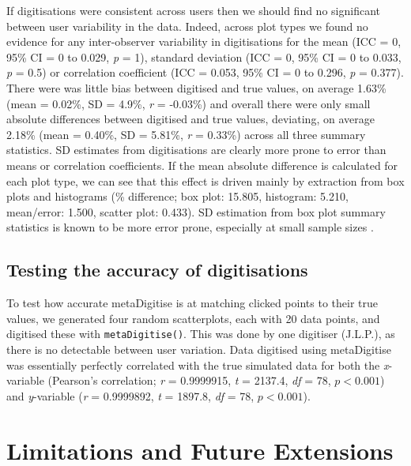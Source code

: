 \documentclass[12pt]{article}
\newcommand{\fct}[1]{\texttt{#1()}}
\newcommand{\pkg}[1]{{\fontseries{b}\selectfont #1}}
\begin{document}
If digitisations were consistent across users then we should find no significant between user variability in the data. Indeed, across plot types we found no evidence for any inter-observer variability in digitisations for the mean (ICC = 0, 95\% CI = 0 to 0.029, \textit{p} = 1), standard deviation (ICC = 0, 95\% CI = 0 to 0.033, \textit{p} = 0.5) or correlation coefficient (ICC = 0.053, 95\% CI = 0 to 0.296, \textit{p} = 0.377). There were was little bias between digitised and true values, on average 1.63\% (mean = 0.02\%, SD = 4.9\%, \textit{r} = -0.03\%) and overall there were only small absolute differences between digitised and true values, deviating, on average 2.18\% (mean = 0.40\%, SD = 5.81\%, \textit{r} = 0.33\%) across all three summary statistics. SD estimates from digitisations are clearly more prone to error than means or correlation coefficients. If the mean absolute difference is calculated for each plot type, we can see that this effect is driven mainly by extraction from box plots and histograms (\% difference; box plot: 15.805, histogram: 5.210, mean/error: 1.500, scatter plot: 0.433). SD estimation from box plot summary statistics is known to be more error prone, especially at small sample sizes \citep{Wan2014}.

\subsection{Testing the accuracy of digitisations}
To test how accurate \pkg{metaDigitise} is at matching clicked points to their true values, we generated four random scatterplots, each with 20 data points, and digitised these with \fct{metaDigitise}. This was done by one digitiser (J.L.P.), as there is no detectable between user variation. Data digitised using \pkg{metaDigitise} was essentially perfectly correlated with the true simulated data for both the \textit{x}-variable (Pearson's correlation; \textit{r} = 0.9999915, \textit{t} = 2137.4, \textit{df} = 78, $p < 0.001$) and \textit{y}-variable (\textit{r} = 0.9999892, \textit{t} = 1897.8, \textit{df} = 78, $p < 0.001$).






\section{Limitations and Future Extensions}
\end{document}
